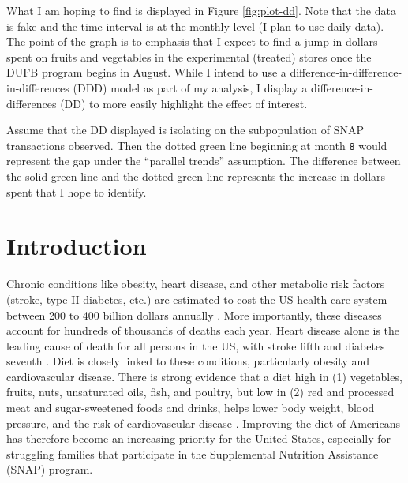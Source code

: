 \documentclass[12pt,letterpaperpaper,]{book}
\begin{document}
What I am hoping to find is displayed in Figure \ref{fig:plot-dd}. Note
that the data is fake and the time interval is at the monthly level (I
plan to use daily data). The point of the graph is to emphasis that I
expect to find a jump in dollars spent on fruits and vegetables in the
experimental (treated) stores once the DUFB program begins in August.
While I intend to use a difference-in-difference-in-differences (DDD)
model as part of my analysis, I display a difference-in-differences (DD)
to more easily highlight the effect of interest.

Assume that the DD displayed is isolating on the subpopulation of SNAP
transactions observed. Then the dotted green line beginning at month
\texttt{8} would represent the gap under the ``parallel trends''
assumption. The difference between the solid green line and the dotted
green line represents the increase in dollars spent that I hope to
identify.

\newpage

\section*{Introduction}\label{intro-1}

Chronic conditions like obesity, heart disease, and other metabolic risk
factors (stroke, type II diabetes, etc.) are estimated to cost the US
health care system between 200 to 400 billion dollars annually
\citep{cawley_medical_2012, chatterjee_checkup_2014}. More importantly,
these diseases account for hundreds of thousands of deaths each year.
Heart disease alone is the leading cause of death for all persons in the
US, with stroke fifth and diabetes seventh
\citep{national_center_for_health_statistics_health_2015}. Diet is
closely linked to these conditions, particularly obesity and
cardiovascular disease. There is strong evidence that a diet high in (1)
vegetables, fruits, nuts, unsaturated oils, fish, and poultry, but low
in (2) red and processed meat and sugar-sweetened foods and drinks,
helps lower body weight, blood pressure, and the risk of cardiovascular
disease
\citep{mente_systematic_2009, nutrition_evidence_library_series_2014}.
Improving the diet of Americans has therefore become an increasing
priority for the United States, especially for struggling families that
participate in the Supplemental Nutrition Assistance (SNAP) program.
\end{document}
